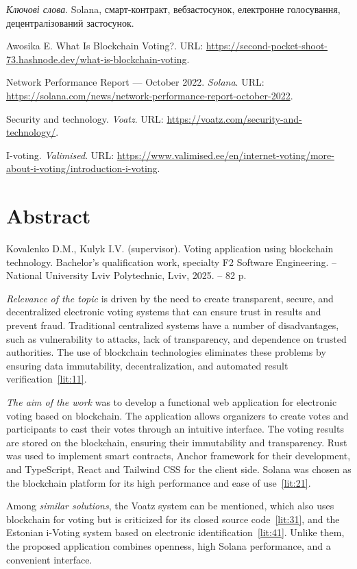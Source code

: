 \documentclass[14pt]{extreport}
\newcommand{\gq}[1]{\guillemotleft{}#1\guillemotright{}}
\newcommand{\plainchap}[1]{
  \chapter*{#1}
}
\begin{document}
  \textit{Ключові слова}. Solana, смарт-контракт, вебзастосунок, електронне голосування, децентралізований застосунок.

  \begin{enumerate}[label={[\arabic*]}]
    \item \label{lit:1} Awosika E. What Is Blockchain Voting?. URL: \url{https://second-pocket-shoot-73.hashnode.dev/what-is-blockchain-voting}.
    \item \label{lit:2} Network Performance Report — October 2022. \textit{Solana}. URL: \url{https://solana.com/news/network-performance-report-october-2022}.
    \item \label{lit:3} Security and technology. \textit{Voatz}. URL: \url{https://voatz.com/security-and-technology/}.
    \item \label{lit:4} I-voting. \textit{Valimised}. URL: \url{https://www.valimised.ee/en/internet-voting/more-about-i-voting/introduction-i-voting}.
  \end{enumerate}
  
  \plainchap{Abstract}
  
  Kovalenko D.M., Kulyk I.V. (supervisor). Voting application using blockchain te\-chnology. Bachelor's qualification work, specialty F2 \gq{Software Engineering}. – Natio\-nal University \gq{Lviv Polytechnic}, Lviv, 2025. – 82 p.

  \textit{Relevance of the topic} is driven by the need to create transparent, secure, and decen\-tralized electronic voting systems that can ensure trust in results and prevent fraud. Traditional centralized systems have a number of disadvantages, such as vulnera\-bility to attacks, lack of transparency, and dependence on trusted authorities. The use of blockchain technologies eliminates these problems by ensuring data immutability, de\-centralization, and automated result verification~\ref{lit:11}.

  \textit{The aim of the work} was to develop a functional web application for electronic voting based on blockchain. The application allows organizers to create votes and parti\-cipants to cast their votes through an intuitive interface. The voting results are stored on the blockchain, ensuring their immutability and transparency. Rust was used to implement smart contracts, Anchor framework for their development, and TypeScript, React and Tailwind CSS for the client side. Solana was chosen as the blockchain plat\-form for its high performance and ease of use~\ref{lit:21}.

  Among \textit{similar solutions}, the Voatz system can be mentioned, which also uses block\-chain for voting but is criticized for its closed source code~\ref{lit:31}, and the Estonian i-Voting system based on electronic identification~\ref{lit:41}. Unlike them, the proposed applica\-tion combines openness, high Solana performance, and a convenient interface.
\end{document}
